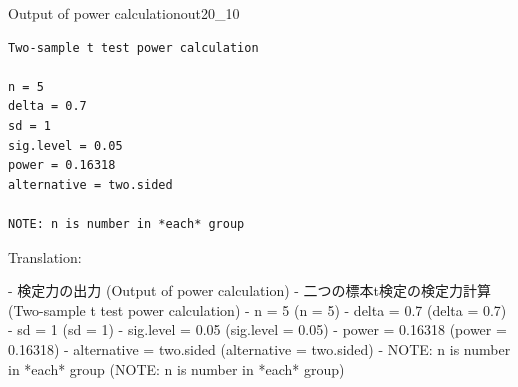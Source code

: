 \begin{Rscreen}{Output of power calculation}{out20_10}
	\begin{verbatim}
Two-sample t test power calculation 

n = 5
delta = 0.7
sd = 1
sig.level = 0.05
power = 0.16318
alternative = two.sided

NOTE: n is number in *each* group
\end{verbatim}
\end{Rscreen}

Translation:

-  検定力の出力 (Output of power calculation)
-  二つの標本t検定の検定力計算 (Two-sample t test power calculation)
-  n = 5 (n = 5)
-  delta = 0.7 (delta = 0.7)
-  sd = 1 (sd = 1)
-  sig.level = 0.05 (sig.level = 0.05)
-  power = 0.16318 (power = 0.16318)
-  alternative = two.sided (alternative = two.sided)
-  NOTE: n is number in *each* group (NOTE: n is number in *each* group)
